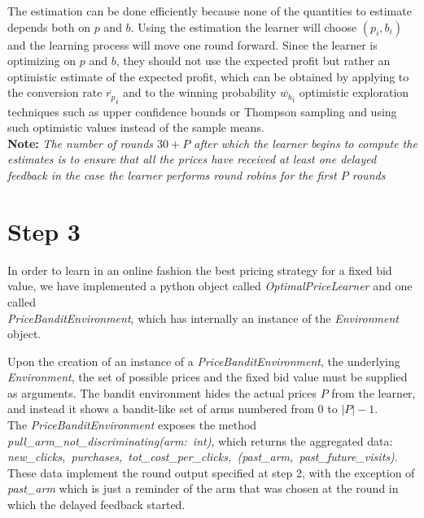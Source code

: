 \documentclass[11pt]{article} %
\begin{document}
The estimation can be done efficiently because none of the quantities to estimate depends both on $p$ and $b$.  Using the estimation the learner will choose $(p_i,b_i)$ and the learning process will move one round forward.
Since the learner is optimizing on $p$ and $b$, they should not use the expected profit but rather an optimistic estimate of the expected profit, which can be obtained by applying to the conversion rate $\overline{r_p}_i$ and to the winning probability $\overline{w_b}_i$ optimistic exploration techniques such as upper confidence bounds or Thompson sampling and using such optimistic values instead of the sample means.\\

\textbf{Note:} \textit{The number of rounds $30+P$ after which the learner begins to compute the estimates is to ensure that all the prices have received at least one delayed feedback in the case the learner performs round robins for the first $P$ rounds}


\clearpage
\section{Step 3}
In order to learn in an online fashion the best pricing strategy for a fixed bid value, we have implemented a python object called \textit{OptimalPriceLearner} and one called\\ \textit{PriceBanditEnvironment}, which has internally an instance of the \textit{Environment} object. 

Upon the creation of an instance of a \textit{PriceBanditEnvironment}, the underlying\\ \textit{Environment}, the set of possible prices and the fixed bid value must be supplied as arguments. The bandit environment hides the actual prices $P$ from the learner, and instead it shows a bandit-like set of arms numbered from $0$ to $|P|-1$.\\

The \textit{PriceBanditEnvironment} exposes the method \mbox{\textit{pull\_arm\_not\_discriminating(arm: int)}}, which returns the aggregated data:\\
\mbox{\textit{new\_clicks, purchases, tot\_cost\_per\_clicks, (past\_arm, past\_future\_visits)}}.\\

These data implement the round output specified at step 2, with the exception of \textit{past\_arm} which is just a reminder of the arm that was chosen at the round in which the delayed feedback started. 
\end{document}
